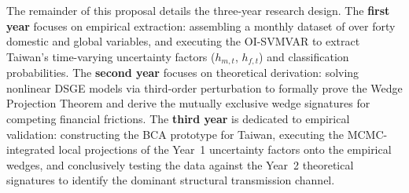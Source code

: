 The remainder of this proposal details the three-year research design. The \textbf{first year} focuses on empirical extraction: assembling a monthly dataset of over forty domestic and global variables, and executing the OI-SVMVAR to extract Taiwan's time-varying uncertainty factors ($h_{m,t}$, $h_{f,t}$) and classification probabilities. The \textbf{second year} focuses on theoretical derivation: solving nonlinear DSGE models via third-order perturbation to formally prove the Wedge Projection Theorem and derive the mutually exclusive wedge signatures for competing financial frictions. The \textbf{third year} is dedicated to empirical validation: constructing the BCA prototype for Taiwan, executing the MCMC-integrated local projections of the Year~1 uncertainty factors onto the empirical wedges, and conclusively testing the data against the Year~2 theoretical signatures to identify the dominant structural transmission channel.
